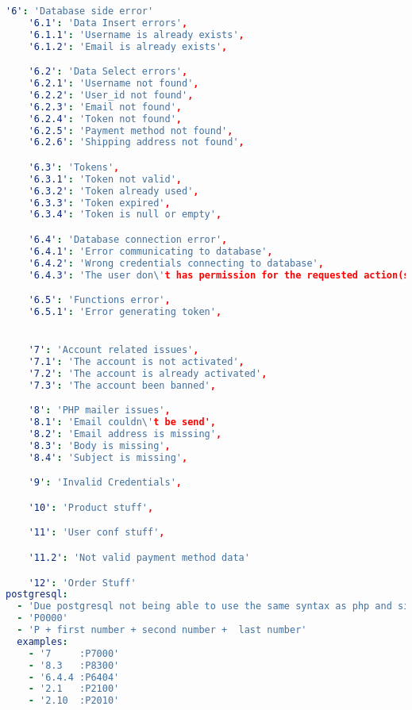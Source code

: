 \begin{lstlisting}[language=yaml,label={lst:errorListing}]
    '6': 'Database side error'
    '6.1': 'Data Insert errors',
    '6.1.1': 'Username is already exists',
    '6.1.2': 'Email is already exists',

    '6.2': 'Data Select errors',
    '6.2.1': 'Username not found',
    '6.2.2': 'User_id not found',
    '6.2.3': 'Email not found',
    '6.2.4': 'Token not found',
    '6.2.5': 'Payment method not found',
    '6.2.6': 'Shipping address not found',

    '6.3': 'Tokens',
    '6.3.1': 'Token not valid',
    '6.3.2': 'Token already used',
    '6.3.3': 'Token expired',
    '6.3.4': 'Token is null or empty',

    '6.4': 'Database connection error',
    '6.4.1': 'Error communicating to database',
    '6.4.2': 'Wrong credentials connecting to database',
    '6.4.3': 'The user don\'t has permission for the requested action(s)',

    '6.5': 'Functions error',
    '6.5.1': 'Error generating token',


    '7': 'Account related issues',
    '7.1': 'The account is not activated',
    '7.2': 'The account is already activated',
    '7.3': 'The account been banned',

    '8': 'PHP mailer issues',
    '8.1': 'Email couldn\'t be send',
    '8.2': 'Email address is missing',
    '8.3': 'Body is missing',
    '8.4': 'Subject is missing',

    '9': 'Invalid Credentials',

    '10': 'Product stuff',

    '11': 'User conf stuff',

    '11.2': 'Not valid payment method data'

    '12': 'Order Stuff'
postgresql:
  - 'Due postgresql not being able to use the same syntax as php and since the error codes seems easy to read using the syntax already done, it's been decided to leave the php and js codes as they, while using a similar (but valid) syntax for postgresql.'
  - 'P0000'
  - 'P + first number + second number +  last number'
  examples:
    - '7     :P7000'
    - '8.3   :P8300'
    - '6.4.4 :P6404'
    - '2.1   :P2100'
    - '2.10  :P2010'
\end{lstlisting}
